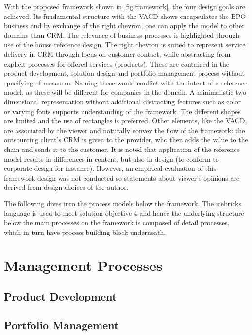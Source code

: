 	 
	 With the proposed framework shown in \Fig \ref{fig:framework}, the four design goals are achieved. Its fundamental structure with the \acrshort{VACD} shows encapsulates the BPO business and by exchange of the right chevron, one can apply the model to other domains than \acrshort{CRM}. The relevance of business processes is highlighted through use of the house reference design. The right chevron is suited to represent service delivery in  \acrshort{CRM} through focus on customer contact, while abstracting from explicit processes for offered services (products). These are contained in the product development, solution design and portfolio management process without specifying of measures. Naming these would conflict with the intent of a reference model, as these will be different for companies in the domain. A minimalistic two dimensional representation without additional distracting features such as color or varying fonts supports understanding of the framework. The different shapes are limited and the use of rectangles is preferred. Other elements, like the \acrshort{VACD}, are associated by the viewer and naturally convey the flow of the framework: the outsourcing client's \acrshort{CRM} is given to the provider, who then adds the value to the chain and sends it to the customer. It is noted that application of the reference model results in differences in content, but also in design (to conform to corporate design for instance). However, an empirical evaluation of this framework design was not conducted so statements about viewer's opinions are derived from design choices of the author. 
	 
	 The following dives into the process models below the framework. The icebricks language is used to meet solution objective 4 and hence the underlying structure below the main processes on the framework is composed of detail processes, which in turn have process building block underneath. 
	 
	\section{Management Processes}
	\subsection{Product Development}
	
	\subsection{Portfolio Management}
	
